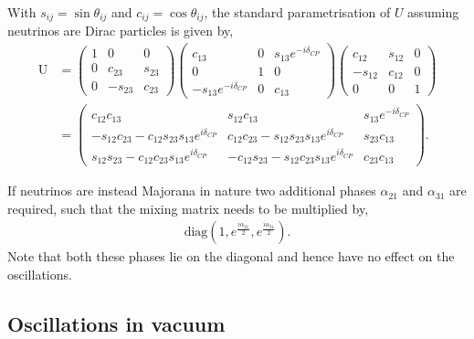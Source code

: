 With $s_{ij}=\sin \theta_{ij}$ and $c_{ij}=\cos \theta_{ij}$, the standard parametrisation of
$U$ assuming neutrinos are Dirac particles is given by,
\begin{align} %
    \mathrm{U} & =
    \begin{pmatrix}
        1 & 0       & 0      \\
        0 & c_{23}  & s_{23} \\
        0 & -s_{23} & c_{23}
    \end{pmatrix}
    \begin{pmatrix}
        c_{13}                   & 0 & s_{13}e^{-i\delta_{CP}} \\
        0                        & 1 & 0                       \\
        -s_{13}e^{-i\delta_{CP}} & 0 & c_{13}
    \end{pmatrix}
    \begin{pmatrix}
        c_{12}  & s_{12} & 0 \\
        -s_{12} & c_{12} & 0 \\
        0       & 0      & 1
    \end{pmatrix}
    \label{eq:matrix}
    \\
               & =
    \begin{pmatrix}
        c_{12}c_{13}
         & s_{12}c_{13}
         & s_{13}e^{-i\delta_{CP}}                          \\
        -s_{12}c_{23}-c_{12}s_{23}s_{13}e^{i\delta_{CP}}
         & c_{12}c_{23}-s_{12}s_{23}s_{13}e^{i\delta_{CP}}
         & s_{23}c_{13}                                     \\
        s_{12}s_{23}-c_{12}c_{23}s_{13}e^{i\delta_{CP}}
         & -c_{12}s_{23}-s_{12}c_{23}s_{13}e^{i\delta_{CP}}
         & c_{23}c_{13}
    \end{pmatrix}.
\end{align} %

If neutrinos are instead Majorana in nature two additional phases $\alpha_{21}$ and $\alpha_{31}$
are required, such that the mixing matrix needs to be multiplied by,
\begin{align} %
    \mathrm{diag}(1, e^{\frac{i\alpha_{21}}{2}}, e^{\frac{i\alpha_{31}}{2}}).
\end{align} %
Note that both these phases lie on the diagonal and hence have no effect on the oscillations.

\subsection{Oscillations in vacuum} %
\label{sec:theory_oscillations_vacuum} %

